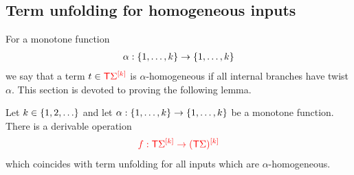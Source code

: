 
\subsection{Term unfolding for homogeneous inputs}
\label{sec:homo-unfold}
For a monotone function 
\begin{align*}
\alpha: \set{1,\ldots,k} \to \set{1,\ldots,k}
\end{align*}
we say that a term $ t \in \tmonad \mati k \rSigma$ is $\alpha$-homogeneous if all internal branches have twist $\alpha$. This section is devoted to proving the following lemma. 

\begin{lemma}\label{lem:homo-twist}
    Let $k \in \set{1,2,\ldots}$ and let $\alpha : \set{1,\ldots,k} \to \set{1,\ldots,k}$ be a monotone function. There is a derivable operation 
    \begin{align*}
        \ranked{f : \tmonad \mati k \rSigma \to \mati k {(\tmonad \Sigma)} }
        \end{align*}      
which coincides with term unfolding for all inputs which are $\alpha$-homogeneous.
\end{lemma}

